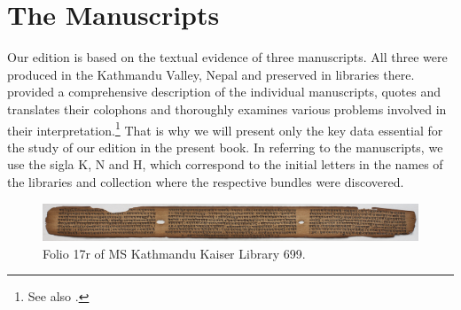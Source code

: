 \chapter{The Manuscripts}

Our edition is based on the textual evidence of three manuscripts.  All three were
produced in the Kathmandu Valley, Nepal and preserved in libraries there.
\textcites[\S 2.1]{kleb-2021b} provided a comprehensive description of the
individual manuscripts, quotes and translates their colophons and thoroughly
examines various problems involved in their interpretation.\footnote{See also 
\cite{hari-2010,hari-2011,hari-2014}.} That is why we will
present only the key data essential for the study of our edition in the present
book. In referring to the manuscripts, we use the sigla K, N and H, which
correspond to the initial letters in the names of the libraries and collection
where the respective bundles were discovered.

\begin{figure}[t]
    \centering
    \includegraphics[draft=false,width=1\linewidth]{"media/017r IMG_0065"}
    \caption{Folio 17r of MS Kathmandu Kaiser Library 699.}
    \label{fig:017r-img0065}
\end{figure}


